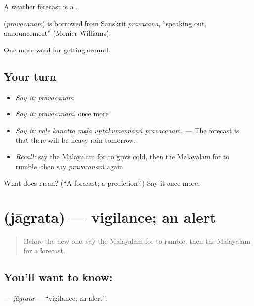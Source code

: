 A weather forecast is a  .

\begin{cousinweb}
\textbf{} (\emph{pravacanaṁ}) is borrowed from Sanskrit \emph{pravacana}, \textquotedblleft{}speaking out, announcement\textquotedblright{} (Monier-Williams).
\end{cousinweb}

\begin{grammarlens}[title={What you've built}]
One more word for getting around.
\end{grammarlens}

\subsection*{Your turn}
\begin{itemize}
\raggedright
  \item \emph{Say it:} \emph{pravacanaṁ}
  \item \emph{Say it:} \emph{pravacanaṁ}, once more
  \item \emph{Say it:} \emph{nāḷe kanatta maḻa uṇṭākumennāṇŭ pravacanaṁ.} — The forecast is that there will be heavy rain tomorrow.
  \item \emph{Recall:} say the Malayalam for to grow cold, then the Malayalam for to rumble, then say \emph{pravacanaṁ} again
\end{itemize}

\begin{tcolorbox}[breakable,colback=teal!4,colframe=teal!35!black,title={Before you move on}]
What does  mean? (\textquotedblleft{}A forecast; a prediction\textquotedblright{}.) Say it once more.
\end{tcolorbox}
\section[\texorpdfstring{\ml{ജാഗ്രത} (jāgrata)}{ജാഗ്രത (jāgrata)}]{ (jāgrata) — vigilance; an alert}

\label{lesson:ML-C511-jagrata}



\begin{quote}
Before the new one: say the Malayalam for to rumble, then the Malayalam for a forecast.
\end{quote}

\subsection*{You'll want to know: }
\textbf{} — \emph{jāgrata} — \textquotedblleft{}vigilance; an alert\textquotedblright{}.


